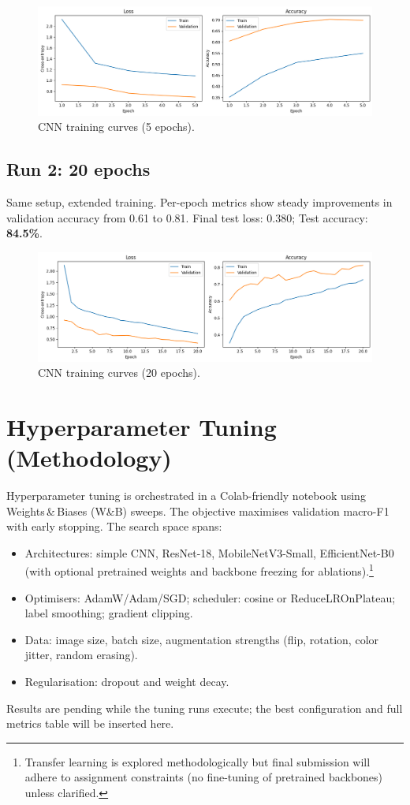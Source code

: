 \documentclass[11pt,a4paper]{article}
\begin{document}
\begin{figure}[H]
  \centering
  \includegraphics[width=0.85\linewidth]{baseline_cnn_pytorch1.png}
  \caption{CNN training curves (5 epochs).}
  \label{fig:cnn-5ep}
\end{figure}

\subsection{Run 2: 20 epochs}
Same setup, extended training.\newline
Per-epoch metrics show steady improvements in validation accuracy from 0.61 to 0.81.\newline
Final test loss: 0.380; Test accuracy: \textbf{84.5\%}.

\begin{figure}[H]
  \centering
  \includegraphics[width=0.85\linewidth]{baseline_cnn_pytorch2.png}
  \caption{CNN training curves (20 epochs).}
  \label{fig:cnn-20ep}
\end{figure}

\section{Hyperparameter Tuning (Methodology)}
Hyperparameter tuning is orchestrated in a Colab-friendly notebook using Weights\,&\,Biases (W\&B) sweeps. The objective maximises validation macro-F1 with early stopping. The search space spans:
\begin{itemize}
  \item Architectures: simple CNN, ResNet-18, MobileNetV3-Small, EfficientNet-B0 (with optional pretrained weights and backbone freezing for ablations).\footnote{Transfer learning is explored methodologically but final submission will adhere to assignment constraints (no fine-tuning of pretrained backbones) unless clarified.}
  \item Optimisers: AdamW/Adam/SGD; scheduler: cosine or ReduceLROnPlateau; label smoothing; gradient clipping.
  \item Data: image size, batch size, augmentation strengths (flip, rotation, color jitter, random erasing).
  \item Regularisation: dropout and weight decay.
\end{itemize}
Results are pending while the tuning runs execute; the best configuration and full metrics table will be inserted here.
\end{document}
